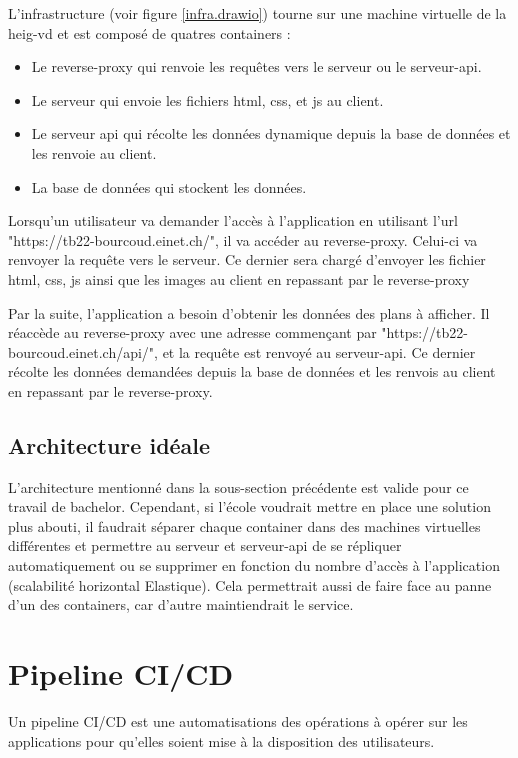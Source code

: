 \documentclass[
    iai, %
    il, %
]{heig-tb}
\begin{document}
L'infrastructure (voir figure \ref{infra.drawio}) tourne sur une machine virtuelle de la \gls{heig-vd} et est composé de quatres containers :


\begin{itemize}
    \item Le reverse-proxy qui renvoie les requêtes vers le serveur ou le serveur-api.
    \item Le serveur qui envoie les fichiers \gls{html}, \gls{css}, et \gls{js} au client.
    \item Le serveur api qui récolte les données dynamique depuis la base de données et les renvoie au client.
    \item La base de données qui stockent les données.
\end{itemize}

Lorsqu'un utilisateur va demander l'accès à l'application en utilisant l'url "https://tb22-bourcoud.einet.ch/", il va accéder au reverse-proxy.
Celui-ci va renvoyer la requête vers le serveur.
Ce dernier sera chargé d'envoyer les fichier \gls{html}, \gls{css}, \gls{js} ainsi que les images au client en repassant par le reverse-proxy

Par la suite, l'application a besoin d'obtenir les données des plans à afficher. Il réaccède au reverse-proxy avec une adresse commençant par "https://tb22-bourcoud.einet.ch/api/",
et la requête est renvoyé au serveur-api. Ce dernier récolte les données demandées depuis la base de données et les renvois au client en repassant par le reverse-proxy.

\subsection{Architecture idéale}
L'architecture mentionné dans la sous-section précédente est valide pour ce travail de bachelor.
Cependant, si l'école voudrait mettre en place une solution plus abouti,
il faudrait séparer chaque container dans des machines virtuelles différentes
et permettre au serveur et serveur-api de se répliquer automatiquement
ou se supprimer en fonction du nombre d'accès à l'application (scalabilité horizontal Elastique).
Cela permettrait aussi de faire face au panne d'un des containers, car d'autre maintiendrait le service.

\section{Pipeline CI/CD}
Un pipeline CI/CD est une automatisations des opérations à opérer sur les applications pour qu'elles soient mise à la disposition des utilisateurs.
\end{document}
